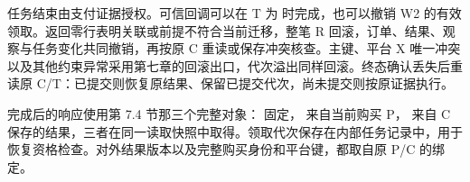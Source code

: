 任务结束由支付证据授权。可信回调可以在 T 为  时完成，也可以撤销 W2 的有效领取。返回零行表明关联或前提不符合当前迁移，整笔 R 回滚，订单、结果、观察与任务变化共同撤销，再按原 C 重读或保存冲突核查。主键、平台 X 唯一冲突以及其他约束异常采用第七章的回滚出口，代次溢出同样回滚。终态确认丢失后重读原 C/T：已提交则恢复原结果、保留已提交代次，尚未提交则按原证据执行。

完成后的响应使用第 7.4 节那三个完整对象： 固定， 来自当前购买 P， 来自 C 保存的结果，三者在同一读取快照中取得。领取代次保存在内部任务记录中，用于恢复资格检查。对外结果版本以及完整购买身份和平台键，都取自原 P/C 的绑定。

